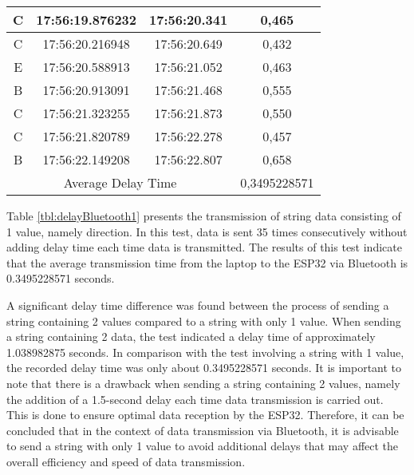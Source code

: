 \begin{table}[!h]
\begin{tabular}{|ccc|c|}
  \multicolumn{1}{|c|}{C}    & \multicolumn{1}{c|}{17:56:19.876232} & 17:56:20.341       & 0,465        \\ \hline
  \multicolumn{1}{|c|}{C}    & \multicolumn{1}{c|}{17:56:20.216948} & 17:56:20.649       & 0,432        \\ \hline
  \multicolumn{1}{|c|}{E}    & \multicolumn{1}{c|}{17:56:20.588913} & 17:56:21.052       & 0,463        \\ \hline
  \multicolumn{1}{|c|}{B}    & \multicolumn{1}{c|}{17:56:20.913091} & 17:56:21.468       & 0,555        \\ \hline
  \multicolumn{1}{|c|}{C}    & \multicolumn{1}{c|}{17:56:21.323255} & 17:56:21.873       & 0,550        \\ \hline
  \multicolumn{1}{|c|}{C}    & \multicolumn{1}{c|}{17:56:21.820789} & 17:56:22.278       & 0,457        \\ \hline
  \multicolumn{1}{|c|}{B}    & \multicolumn{1}{c|}{17:56:22.149208} & 17:56:22.807       & 0,658        \\ \hline
  \multicolumn{3}{|c|}{Average Delay Time}                                               & 0,3495228571 \\ \hline
  \end{tabular}
\end{table}

Table \ref{tbl:delayBluetooth1} presents the transmission of string data consisting of 1 value, namely direction. In this test, data is sent 35 times consecutively without adding delay time each time data is transmitted. The results of this test indicate that the average transmission time from the laptop to the ESP32 via Bluetooth is 0.3495228571 seconds.

A significant delay time difference was found between the process of sending a string containing 2 values compared to a string with only 1 value. When sending a string containing 2 data, the test indicated a delay time of approximately 1.038982875 seconds. In comparison with the test involving a string with 1 value, the recorded delay time was only about 0.3495228571 seconds. It is important to note that there is a drawback when sending a string containing 2 values, namely the addition of a 1.5-second delay each time data transmission is carried out. This is done to ensure optimal data reception by the ESP32. Therefore, it can be concluded that in the context of data transmission via Bluetooth, it is advisable to send a string with only 1 value to avoid additional delays that may affect the overall efficiency and speed of data transmission.

